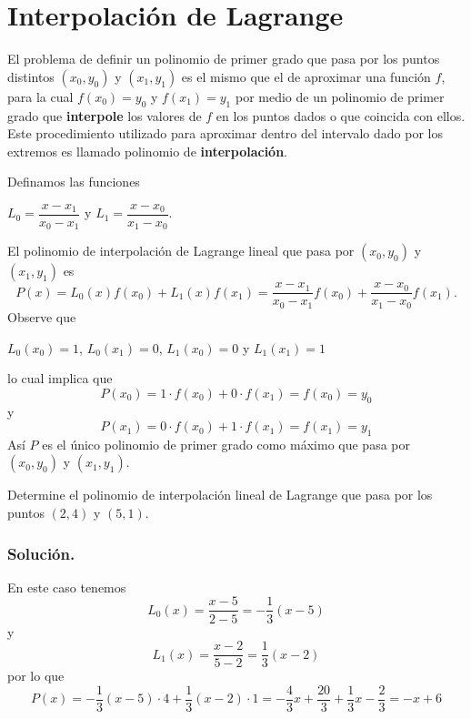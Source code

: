 
\section{Interpolación de Lagrange}
El problema de definir un polinomio de primer grado que pasa por los puntos distintos $(x_0, y_0)$ y $(x_1, y_1)$ es el mismo que el de 
aproximar una función $f$, para la cual $f(x_0) = y_0$ y $f(x_1) = y_1$ por medio de un polinomio de primer grado que \textbf{interpole} 
los valores de $f$ en los puntos dados o que coincida con ellos. Este procedimiento utilizado para aproximar dentro del intervalo dado 
por los extremos es llamado polinomio de \textbf{interpolación}.

Definamos las funciones 

\begin{center}
	$L_0 = \dfrac{x - x_1}{x_0 - x_1}$ y $L_1 = \dfrac{x - x_0}{x_1 - x_0}$.
\end{center}

El polinomio de interpolación de Lagrange lineal que pasa por $(x_0, y_0)$ y $(x_1, y_1)$ es
$$P(x) = L_0(x)f(x_0) + L_1(x)f(x_1) = \dfrac{x - x_1}{x_0 - x_1}f(x_0) + \dfrac{x - x_0}{x_1 - x_0}f(x_1).$$
Observe que

\begin{center}
	$L_0(x_0) = 1$, $L_0(x_1) = 0$, $L_1(x_0) = 0$ y $L_1(x_1) = 1$
\end{center}

lo cual implica que 
$$P(x_0) = 1\cdot f(x_0) + 0\cdot f(x_1) = f(x_0) = y_0$$
y
$$P(x_1) = 0\cdot f(x_0) + 1\cdot f(x_1) = f(x_1) = y_1$$
Así $P$ es el único polinomio de primer grado como máximo que pasa por $(x_0, y_0)$ y $(x_1, y_1)$.

\begin{exerciseT}
	Determine el polinomio de interpolación lineal de Lagrange que pasa por los puntos $(2, 4)$ y $(5, 1)$.\\
	\subsubsection*{Solución.} En este caso tenemos
		$$L_0(x) = \dfrac{x-5}{2-5} = -\frac{1}{3}(x-5)$$	
		y
		$$L_1(x) = \dfrac{x-2}{5-2} = \frac{1}{3}(x-2)$$
		por lo que
		$$P(x) = -\frac{1}{3}(x-5)\cdot 4 + \frac{1}{3}(x-2)\cdot 1 = -\frac{4}{3}x + \frac{20}{3} + \frac{1}{3}x - \frac{2}{3} = -x + 6$$
\end{exerciseT}

